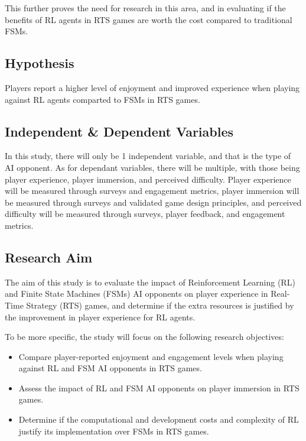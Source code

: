 \documentclass[conference]{IEEEtran}
\begin{document}
This further proves the need for research in this area, and in evaluating if the benefits of RL agents in RTS games are worth the cost compared to traditional FSMs.

\subsection{Hypothesis}

Players report a higher level of enjoyment and improved experience when playing against RL agents comparted to FSMs in RTS games.

\subsection{Independent \& Dependent Variables}


In this study, there will only be 1 independent variable, and that is the type of AI opponent. As for dependant variables, there will be multiple, with those being player experience, player immersion, and 
perceived difficulty. Player experience will be measured through surveys and engagement metrics, player immersion will be measured through surveys and validated game design principles, and perceived difficulty
will be measured through surveys, player feedback, and engagement metrics.

\subsection{Research Aim}

The aim of this study is to evaluate the impact of Reinforcement Learning (RL) and Finite State Machines (FSMs) AI opponents on player experience in Real-Time Strategy (RTS) games, and determine if the extra resources
is justified by the improvement in player experience for RL agents.

To be more specific, the study will focus on the following research objectives:

\begin{itemize}
    \item Compare player-reported enjoyment and engagement levels when playing against RL and FSM AI opponents in RTS games.
    \item Assess the impact of RL and FSM AI opponents on player immersion in RTS games.
    \item Determine if the computational and development costs and complexity of RL justify its implementation over FSMs in RTS games.
\end{itemize}
\end{document}
